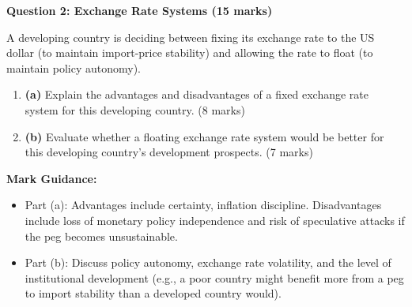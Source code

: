 \documentclass[11pt, a4paper, twoside]{book}
\begin{document}
\begin{exampractice}

\textbf{Question 2: Exchange Rate Systems (15 marks)}

A developing country is deciding between fixing its exchange rate to the US dollar (to maintain import-price stability) and allowing the rate to float (to maintain policy autonomy).

\begin{enumerate}
  \item \textbf{(a)} Explain the advantages and disadvantages of a fixed exchange rate system for this developing country. (8 marks)

  \item \textbf{(b)} Evaluate whether a floating exchange rate system would be better for this developing country's development prospects. (7 marks)
\end{enumerate}

\textbf{Mark Guidance:}
\begin{itemize}
  \item Part (a): Advantages include certainty, inflation discipline. Disadvantages include loss of monetary policy independence and risk of speculative attacks if the peg becomes unsustainable.
  \item Part (b): Discuss policy autonomy, exchange rate volatility, and the level of institutional development (e.g., a poor country might benefit more from a peg to import stability than a developed country would).
\end{itemize}

\end{exampractice}
\end{document}
